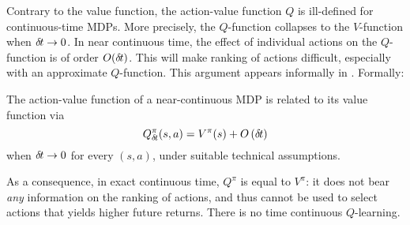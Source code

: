 Contrary to the value function, the action-value function $Q$ is ill-defined
for continuous-time MDPs. More precisely, the $Q$-function  collapses to the
$V$-function when ${\delta\hspace{-.1em}t} \rightarrow 0$. In near continuous time, the effect of
individual actions on the $Q$-function is of order $O({\delta\hspace{-.1em}t})$. This
will make 
ranking of actions difficult, especially with an approximate
$Q$-function.
This argument appears informally in \cite{adv_upd}.
Formally:
\begin{theorem}
  \label{th:q-cont}
The action-value function of a near-continuous MDP is related to its
value function via
\begin{equation}
	\label{eq:q-discr}
	Q^\pi_{\delta\hspace{-.1em}t}(s, a) = V^\pi(s) + O\left({\delta\hspace{-.1em}t}\right)
\end{equation}
when ${\delta\hspace{-.1em}t} \to 0$ for every $(s,a)$, under suitable technical
assumptions.
\end{theorem}

As a consequence, in exact continuous time,
$Q^\pi$ is equal to $V^\pi$:  it does not bear \emph{any} information on the ranking of actions, and
thus cannot be used to select actions that yields higher future returns.
There is no time continuous $Q$-learning.

